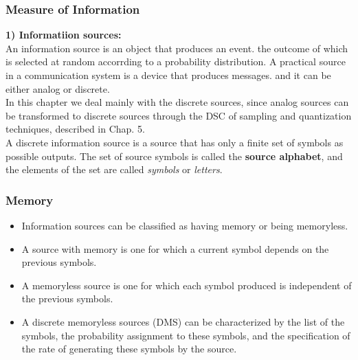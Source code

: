 \documentclass[a4]{beamer}
\begin{document}
\begin{frame}

\frametitle{Measure of Information}

\textbf{1) Informatiion sources:}\\

An information source is an object that produces an event. the outcome of which is selected at
random accorrding to a probability distribution. A practical source in a communication system is a
device that produces messages. and it can be either analog or discrete.\\ In this chapter we deal mainly
with the discrete sources, since analog sources can be transformed to discrete sources through the DSC
of sampling and quantization techniques, described in Chap. 5. \\ \bigskip A discrete information source is a
source that has only a finite set of symbols as possible outputs. The set of source symbols is called the
\textbf{source alphabet}, and the elements of the set are called \emph{ symbols} or \emph{letters}.
\end{frame}


\begin{frame}
\frametitle{Memory}
\begin{itemize} \item Information sources can be classified as having memory or being memoryless.
	\item A source with
	memory is one for which a current symbol depends on the previous symbols.\item A memoryless source is
	one for which each symbol produced is independent of the previous symbols.
	
	\item A discrete memoryless sources (DMS) can be characterized by the list of the symbols, the
	probability assignment to these symbols, and the specification of the rate of generating these symbols by the source.\end{itemize}
\end{frame}
\end{document}
